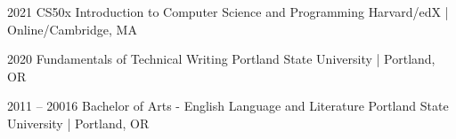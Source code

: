 \documentclass[9pt]{developercv} %
\begin{document}
	\vspace{56pt}
\begin{entrylist}
	\entry
		{2021}
		{CS50x Introduction to Computer Science and Programming}
		{Harvard/edX | Online/Cambridge, MA}
		
	\entry
		{2020}
		{Fundamentals of Technical Writing}
		{Portland State University | Portland, OR}

	\entry
		{2011 -- 20016}
		{Bachelor of Arts - English Language and Literature}
		{Portland State University | Portland, OR}

\end{entrylist}

\end{document}
